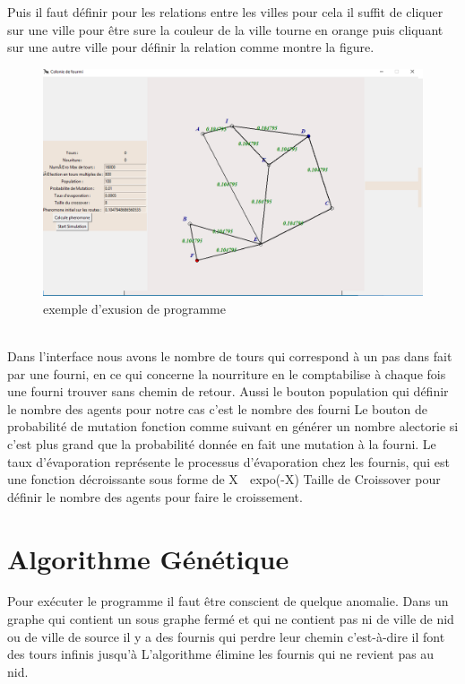 \documentclass{rapportECL}
\begin{document}
Puis il faut définir pour les relations entre les villes pour cela il suffit de cliquer sur une ville pour être sure la couleur de la ville tourne en orange puis cliquant sur une autre ville pour définir la relation comme montre la figure.

 \begin{figure}[H]
    \centering
    \includegraphics[width=0.8\linewidth]{3.png}
    \caption{ exemple d'exusion de programme }
    \label{Dim}
\end{figure}\\

Dans l’interface nous avons le nombre de tours qui correspond à un pas dans fait par une fourni, en ce qui concerne la nourriture en le comptabilise à chaque fois une fourni trouver sans chemin de retour.
Aussi le bouton population qui définir le nombre des agents pour notre cas c’est le nombre des fourni 
Le bouton de probabilité de mutation fonction comme suivant en générer un nombre alectorie si c’est plus grand que la probabilité donnée en fait une mutation à la fourni.
Le taux d’évaporation représente le processus d’évaporation chez les fournis, qui est une fonction décroissante sous forme de X   expo(-X)    
Taille de Croissover pour définir le nombre des agents pour faire le croissement.

\section{Algorithme Génétique}

Pour exécuter le programme il faut être conscient de quelque anomalie.
Dans un graphe qui contient un sous graphe fermé et qui ne contient pas ni de ville de nid ou de ville 
de source il y a des fournis qui perdre leur chemin c’est-à-dire il font des tours infinis jusqu’à
L’algorithme élimine les fournis qui ne revient pas au nid.\\
\end{document}
